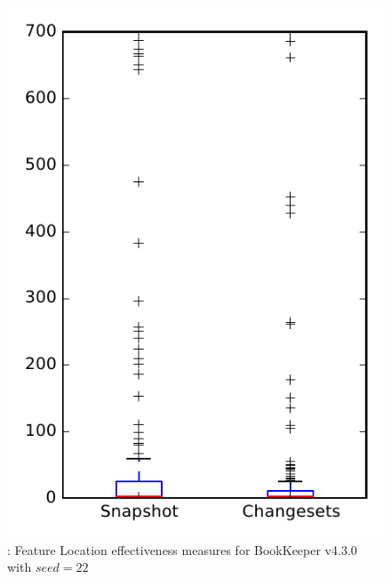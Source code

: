 
\begin{figure}
\centering
\includegraphics[height=0.4\textheight]{figures/flt_seed/rq1_bookkeeper_22}
\caption{\rone: Feature Location effectiveness measures for BookKeeper v4.3.0 with $seed=22$}
\label{fig:flt_seed:rq1:bookkeeper}
\end{figure}
